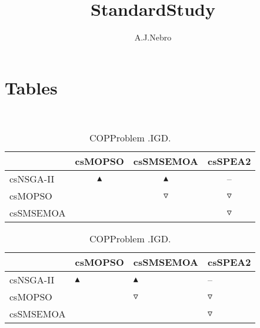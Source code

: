\documentclass{article}
\title{StandardStudy}
\author{A.J.Nebro}
\begin{document}
\maketitle
\section{Tables}
\
\begin{table}
\caption{
COPProblem
.IGD.}
\label{Table:
COPProblem
.IGD.}
\centering
\begin{scriptsize}
\begin{tabular}{
lccc
}
\hline  & csMOPSO & csSMSEMOA & csSPEA2\\ 
\hline 
csNSGA-II
 & 
$\blacktriangle$
 & 
$\blacktriangle$
 & 
--
 \\ 
csMOPSO
 & 
  
 & 
$\triangledown$
 & 
$\triangledown$
 \\ 
csSMSEMOA
 & 
 
 & 
  
 & 
$\triangledown$
 \\ 
\hline
\end{tabular}
\end{scriptsize}
\end{table}
\begin{table}
\caption{
COPProblem 
.IGD.}
\label{Table:
COPProblem 
.IGD.}
\centering
\begin{scriptsize}
\begin{tabular}{
| l | p{0.15cm}   | p{0.15cm}   | p{0.15cm}   | 
}
\hline \multicolumn{1}{|c|}{} & \multicolumn{1}{c|}{csMOPSO} & \multicolumn{1}{c|}{csSMSEMOA} & \multicolumn{1}{c|}{csSPEA2} \\
\hline 
csNSGA-II
 & 
$\blacktriangle$
 & 
$\blacktriangle$
 & 
--
 \\ 
csMOPSO
 & 
  
 & 
$\triangledown$
 & 
$\triangledown$
 \\ 
csSMSEMOA
 & 
 
 & 
  
 & 
$\triangledown$
 \\ 
\hline
\end{tabular}
\end{scriptsize}
\end{table}
\end{document}
